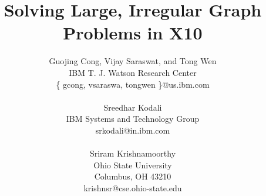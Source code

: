 \documentclass[12pt]{article}
\numberwithin{equation}{section}
\begin{document}
\title{Solving Large, Irregular Graph Problems in X10}

\author{Guojing Cong,  Vijay Saraswat, and Tong Wen\\
IBM T. J. Watson Research Center\\
 \{ gcong, vsaraswa, tongwen \}@us.ibm.com\\ 
\\
Sreedhar Kodali\\
IBM Systems and Technology Group\\
srkodali@in.ibm.com\\
\\
Sriram Krishnamoorthy \\
Ohio State University\\
Columbus, OH 43210 \\
krishnsr@cse.ohio-state.edu
}

\date{}

\maketitle
\thispagestyle{empty}












{\footnotesize


}
\end{document}
